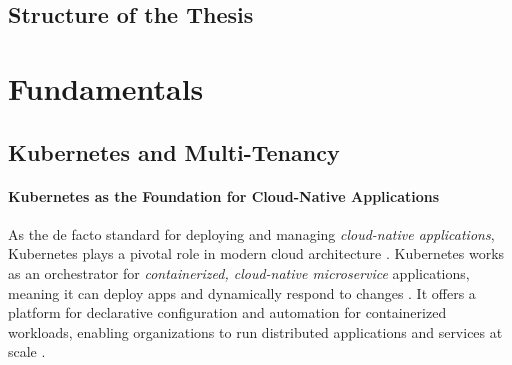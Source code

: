 \documentclass[11pt, a4paper, oneside, draft]{scrartcl}
\begin{document}
        \subsection{Structure of the Thesis}

    \section{Fundamentals}

        \subsection{Kubernetes and Multi-Tenancy}

            \paragraph{Kubernetes as the Foundation for Cloud-Native Applications}
                As the de facto standard for deploying and managing 
                \textit{cloud-native applications}, Kubernetes plays a pivotal role in modern cloud
                architecture \parencite[p.~7--8]{poulton2021}.
                Kubernetes works as an  orchestrator for \textit{containerized,
                cloud-native microservice} applications, meaning it can deploy apps and dynamically
                respond to changes \parencite[p.~3]{poulton2021}.
                It offers a platform for declarative configuration and automation for containerized
                workloads, enabling organizations to run distributed applications and services at
                scale \parencite{kubernetesOverview,redhatWhatIsKubernetes}.
\end{document}
